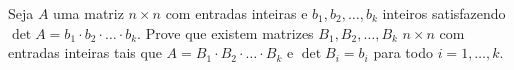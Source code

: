 Seja \(A\) uma matriz \(n \times n\) com entradas inteiras e \(b_{1},b_{2},\dots,b_{k}\) inteiros satisfazendo \(\operatorname{det}A=b_{1}\cdot b_{2}\cdot \dots\cdot b_{k}\). Prove que existem matrizes \(B_{1},B_{2},\dots,B_{k}\) \(n \times n\) com entradas inteiras tais que \(A=B_{1}\cdot B_{2}\cdot \dots\cdot B_{k}\) e \(\operatorname{det}B_{i}=b_{i}\) para todo \(i=1,\dots,k\).
